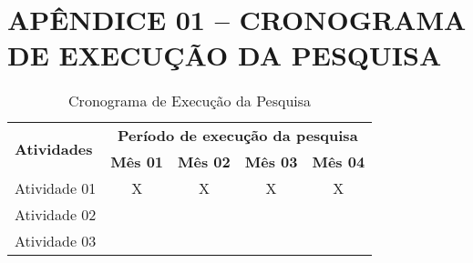 \section{APÊNDICE 01 – CRONOGRAMA DE EXECUÇÃO DA PESQUISA}
\label{sec:apendice-1}



\begin{table}[H]
    \centering
    \begin{tabular}{|l|c|c|c|c|}
        \hline
        \multirow{2}{7.5cm}{\textbf{Atividades}} & \multicolumn{4}{c|}{\textbf{Período de execução da pesquisa}} \\ \cline{2-5}
        & \textbf{Mês 01} & \textbf{Mês 02} & \textbf{Mês 03} & \textbf{Mês 04} \\ \hline
        Atividade 01 & X & X & X & X \\ \hline
        Atividade 02 &   &   &   &   \\ \hline
        Atividade 03 &   &   &   &   \\ \hline
    \end{tabular}
\caption{Cronograma de Execução da Pesquisa}
\end{table}
    